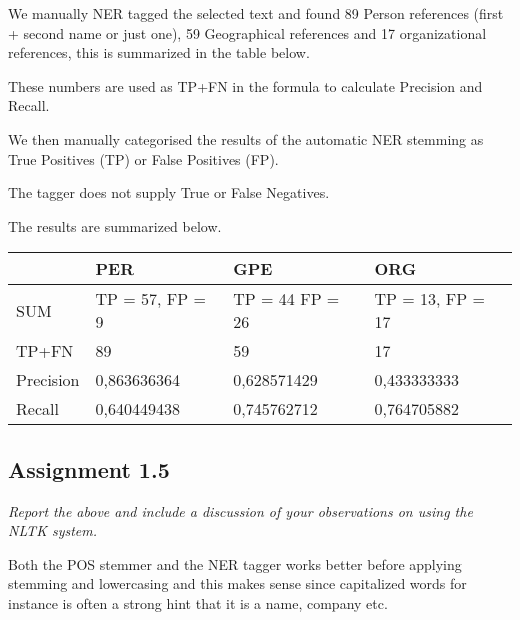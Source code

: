 \documentclass[a4paper]{article}
\begin{document}
We manually NER tagged the selected text and found 89 Person references (first + second name or just one), 59 Geographical 
references and 17 organizational references, this is summarized in the
table below.

These numbers are used as TP+FN in the formula to calculate Precision and Recall.

We then manually categorised the results of the automatic NER stemming as True Positives (TP) or False Positives (FP). 

The tagger does not supply True or False Negatives.

The results are summarized below. 

\begin{center}
    \begin{tabular}{ | l | l | l | l |}
    \hline
           & PER              & GPE             & ORG \\ \hline
    SUM    & TP = 57,  FP = 9 & TP = 44 FP = 26 & TP = 13,  FP = 17 \\ \hline
	TP+FN  &     89           &     59          &      17           \\ \hline
	Precision & 0,863636364   &  0,628571429    & 0,433333333 \\ \hline
	Recall &  0,640449438     &  0,745762712    & 0,764705882 \\ \hline
    \hline
    \end{tabular}
\end{center}
                          

\subsection{Assignment 1.5}
\textit{Report the above and include a discussion of your observations on
using the NLTK system.}

Both the POS stemmer and the NER tagger works better before applying
stemming and lowercasing and this makes sense since capitalized words
for instance is often a strong hint that it is a name, company etc. 
\end{document}
